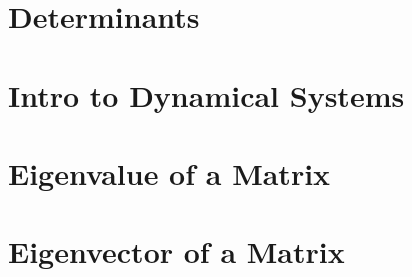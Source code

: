 \documentclass[11pt]{article}
\begin{document}
\section{Determinants}


\section{Intro to Dynamical Systems}


\section{Eigenvalue of a Matrix}


\section{Eigenvector of a Matrix}


\end{document}
